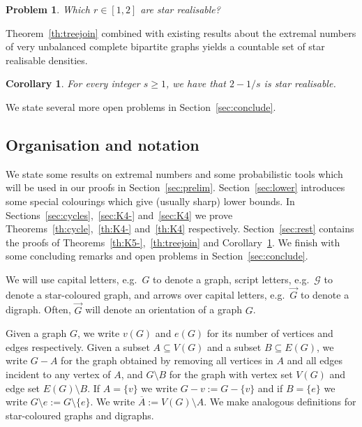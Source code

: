 \documentclass[a4paper, 12pt]{article}
\numberwithin{equation}{section}
\newtheorem{problem}[theorem]{Problem}
\newtheorem{corollary}[theorem]{Corollary}
\def\sm{{\setminus}}
\newcommand{\ova}[1]{\overrightarrow{#1}}
\newcommand{\ms}[1]{\mathscr{#1}}
\begin{document}
\begin{problem}
   Which $r \in [1,2]$ are star realisable?
\end{problem}

Theorem~\ref{th:treejoin} combined with existing results about the extremal numbers of very unbalanced complete bipartite graphs yields a countable set of star realisable densities.

\begin{corollary}\label{th:starreal}
    For every integer $s \geq 1$, we have that $2-1/s$ is star realisable.
\end{corollary}

We state several more open problems in Section~\ref{sec:conclude}.




\subsection{Organisation and notation}

We state some results on extremal numbers and some probabilistic tools which will be used in our proofs in Section~\ref{sec:prelim}.
Section~\ref{sec:lower} introduces some special colourings which give (usually sharp) lower bounds.
In Sections~\ref{sec:cycles},~\ref{sec:K4-} and~\ref{sec:K4} we prove Theorems~\ref{th:cycle},~\ref{th:K4-} and~\ref{th:K4} respectively.
Section~\ref{sec:rest} contains the proofs of Theorems~\ref{th:K5-},~\ref{th:treejoin} and Corollary~\ref{th:starreal}. %
We finish with some concluding remarks and open problems in Section~\ref{sec:conclude}.

\medskip
We will use capital letters, e.g.~$G$ to denote a graph, script letters, e.g.~$\ms{G}$ to denote a star-coloured graph, and arrows over capital letters, e.g.~$\ova{G}$ to denote a digraph. Often, $\ova{G}$ will denote an orientation of a graph $G$.

Given a graph $G$, we write $v(G)$ and $e(G)$ for its number of vertices and edges respectively.
Given a subset $A \subseteq V(G)$ and a subset $B \subseteq E(G)$, we write $G-A$ for the graph obtained by removing all vertices in $A$ and all edges incident to any  vertex of $A$,
and $G \sm B$ for the graph with vertex set $V(G)$ and edge set $E(G)\setminus B$.
If $A=\{v\}$ we write $G-v := G-\{v\}$ and if $B=\{e\}$ we write $G \sm e := G\sm\{e\}$.
We write $\overline{A} := V(G) \sm A$.
We make analogous definitions for star-coloured graphs and digraphs.
\end{document}
